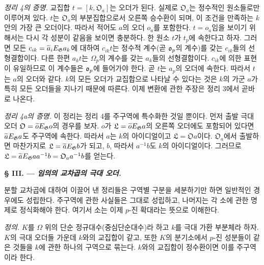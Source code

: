 \medskip
\noindent\emph{정리 4의 증명.} 교집합 $t=[k,\mathfrak O_a]$는 오더가 된다. 실제로 $\mathfrak O_a$는 정수적인 원소들로만 이루어져 있다. $t$는 $\mathfrak O_a$의 부분집합으로서 오른쪽 승수환이 되며, 이 조건을 만족하는 $k$ 안의 가장 큰 오더이다. 따라서 적어도 $a$의 오더 $o_a$를 포함한다. $t=o_a$임을 보이기 위해서는 다시 각 성분이 같음을 보이면 충분하다. 한 원소 $t$가 $t_p$에 속한다고 하자. 그러면 모든 $c_{ik}=\widetilde a_iE_\mathfrak G a_k$에 대하여 $c_{ik}t$는 정수적 계수(곧 $\mathfrak o_p$의 계수)를 갖는 $c_{ik}$들의 선형결합이다. 다른 한편 $a_kt$는 $\Omega_p$의 계수를 갖는 $a_k$들의 선형결합이다. $c_{ik}$에 의한 표현이 유일하므로 이 계수들은 $\mathfrak o_p$에 들어가야 한다. 곧 $t$는 $a_p$의 오더에 속한다. 따라서 $t$는 $a$의 오더와 같다. $k$의 모든 오더가 교집합으로 나타날 수 있다는 것은 $k$의 가군 $a$가 특히 모든 오더들을 지나기 때문에 따른다. 이제 변환에 관한 주장은 정리 3에서 곧바로 나온다.

\medskip
\noindent\emph{정리 4a의 증명.} 이 정리는 정리 4를 주구역에 특수화한 것일 뿐이다. 먼저 출발 극대 오더 $\mathfrak O=\widetilde oE_\mathfrak G o$의 경우를 보자. $o$가 $\mathfrak L=\widetilde oE_\mathfrak G a$의 오른쪽 오더에도 포함되어 있다면 $\widetilde aE_\mathfrak G a$도 주구역에 속한다. 따라서 $a$는 $k$의 아이디얼이고 $\mathfrak L=\mathfrak Oa$이다. $\mathfrak O_a$에서 출발하면 마찬가지로 $\mathfrak L=\widetilde aE_\mathfrak G b$가 되고, $b$, 따라서 $a^{-1}b$도 $k$의 아이디얼이다. 그러므로 $\mathfrak L=\widetilde aE_\mathfrak G aa^{-1}b=\mathfrak O_a a^{-1}b$를 얻는다.

\begin{center}
\textbf{§ III. --- \emph{임의의 교차곱의 극대 오더.}}
\end{center}

분할 교차곱에 대하여 이끌어 낸 정리들은 구역별 구분을 세분하기만 하면 일반적인 경우에도 성립한다. 주구역에 관한 사실들은 그대로 성립하고, 나머지는 각 소에 관한 명제로 정식화해야 한다. 여기서 소는 이제 $p$-진 확대라는 뜻으로 이해한다.

\emph{정의.} $K$를 $\Omega$ 위의 단순 정규대수(중심단순대수)라 하고 $k$를 극대 가환 부분체라 하자. $K$의 극대 오더들 가운데 $k$와의 교집합이 같고, 또한 $K$의 분기소에서 $p$-진 성분들이 같은 것들을 $k$에 관한 하나의 구역으로 묶는다. $k$와의 교집합이 정수환이면 이를 주구역이라 한다.

